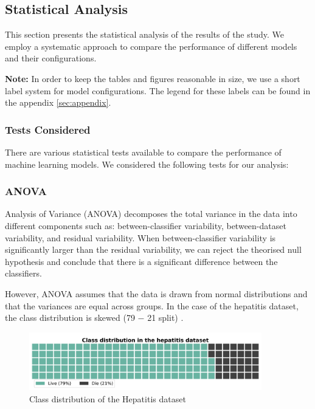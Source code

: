 \subsection{Statistical Analysis}
\label{sec:statistical-analysis}

This section presents the statistical analysis of the results of the study.
We employ a systematic approach to compare the performance of different models and their configurations.

\textbf{Note:} In order to keep the tables and figures reasonable in size, we use a short label system
for model configurations. The legend for these labels can be found in the appendix \autoref{sec:appendix}.

\subsubsection*{Tests Considered}
There are various statistical tests available to compare the performance of machine learning models.
We considered the following tests for our analysis:

\subsubsection{ANOVA}
Analysis of Variance (ANOVA) decomposes the total variance in the data into different components such as:
between-classifier variability, between-dataset variability, and residual variability. When between-classifier
variability is significantly larger than the residual variability, we can reject the theorised null hypothesis and
conclude that there is a significant difference between the classifiers.

However, ANOVA assumes that the data is drawn from normal distributions and that the variances are equal across groups.
In the case of the hepatitis dataset, the class distribution is skewed (79 $-$ 21 split) \cite{StatisticalComparisonsOfClassifiersOverMultipleDataSetsJML,Friedman_anova}.

\begin{figure}[!ht]
    \centering
    \includegraphics[width=0.9\textwidth]{figures/hepatitis-class-distribution.png}
    \caption{Class distribution of the Hepatitis dataset}
\label{fig:class-distribution-hepatitis}
\end{figure}

